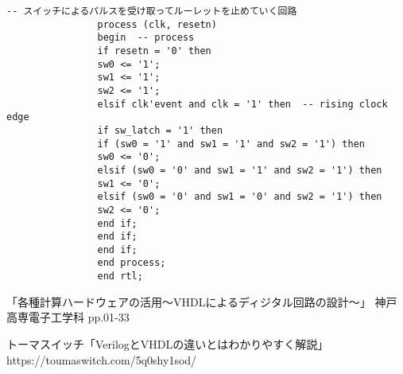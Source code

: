\documentclass{ltjsarticle}
\begin{document}
\begin{lstlisting}[caption=sample8, label=sample8]
				-- スイッチによるパルスを受け取ってルーレットを止めていく回路
				process (clk, resetn)
				begin  -- process
				if resetn = '0' then
				sw0 <= '1';
				sw1 <= '1';
				sw2 <= '1';
				elsif clk'event and clk = '1' then  -- rising clock edge
				if sw_latch = '1' then
				if (sw0 = '1' and sw1 = '1' and sw2 = '1') then
				sw0 <= '0';
				elsif (sw0 = '0' and sw1 = '1' and sw2 = '1') then
				sw1 <= '0';
				elsif (sw0 = '0' and sw1 = '0' and sw2 = '1') then
				sw2 <= '0';
				end if;
				end if;
				end if;
				end process;
				end rtl;

			\end{lstlisting}



\begin{thebibliography}{99}
「各種計算ハードウェアの活用～VHDLによるディジタル回路の設計～」
神戸高専電子工学科 pp.01-33

トーマスイッチ「VerilogとVHDLの違いとはわかりやすく解説」
https://toumaswitch.com/5q0shy1sod/
\end{thebibliography}
\end{document}
